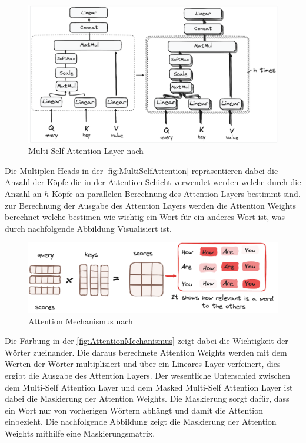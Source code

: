 \documentclass[conference]{IEEEtran}
\begin{document}
\begin{figure}[htbp]
    \centerline{\includegraphics[width=\linewidth]{Bilder/MultiheadSelfAttention.png}}
    \caption{Multi-Self Attention Layer nach \cite{WieTransformatorenFunktionieren}}
\label{fig:MultiSelfAttention}
\end{figure}
Die Multiplen Heads in der \autoref{fig:MultiSelfAttention} repräsentieren dabei die Anzahl der Köpfe die in der Attention Schicht verwendet werden welche durch die Anzahl an $h$ Köpfe an parallelen Berechnung des Attention Layers bestimmt sind.
zur Berechnung der Ausgabe des Attention Layers werden die Attention Weights berechnet welche bestimen wie wichtig ein Wort für ein anderes Wort ist, was durch nachfolgende Abbildung Visualisiert ist.
\begin{figure}[htbp]
    \centerline{\includegraphics[width=\linewidth]{Bilder/AttentionMechanismus.png}}
    \caption{Attention Mechanismus nach \cite{WieTransformatorenFunktionieren}}
\label{fig:AttentionMechanismus}
\end{figure}
Die Färbung in der \autoref{fig:AttentionMechanismus} zeigt dabei die Wichtigkeit der Wörter zueinander. Die daraus berechnete Attention Weights werden mit dem Werten der Wörter multipliziert und über ein Lineares Layer verfeinert, dies ergibt die Ausgabe des Attention Layers. Der wesentliche Unterschied zwischen dem Multi-Self Attention Layer und dem Masked Multi-Self Attention Layer ist dabei die Maskierung der Attention Weights. Die Maskierung sorgt dafür, dass ein Wort nur von vorherigen Wörtern abhängt und damit die Attention einbezieht. Die nachfolgende Abbildung zeigt die Maskierung der Attention Weights mithilfe eine Maskierungsmatrix.
\end{document}
